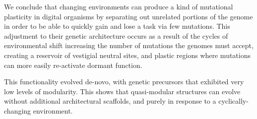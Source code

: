 We conclude that changing environments can produce a kind of mutational plasticity in digital organisms by separating out unrelated portions of the genome in order to be able to quickly gain and lose a task via few mutations. This adjustment to their genetic architecture occurs as a result of the cycles of environmental shift increasing the number of mutations the genomes must accept, creating a reservoir of vestigial neutral sites, and plastic regions where mutations can more easily re-activate dormant function.

This functionality evolved de-novo, with genetic precursors that exhibited very low levels of modularity. This shows that quasi-modular structures can evolve without additional architectural scaffolds, and purely in response to a cyclically-changing environment. 
